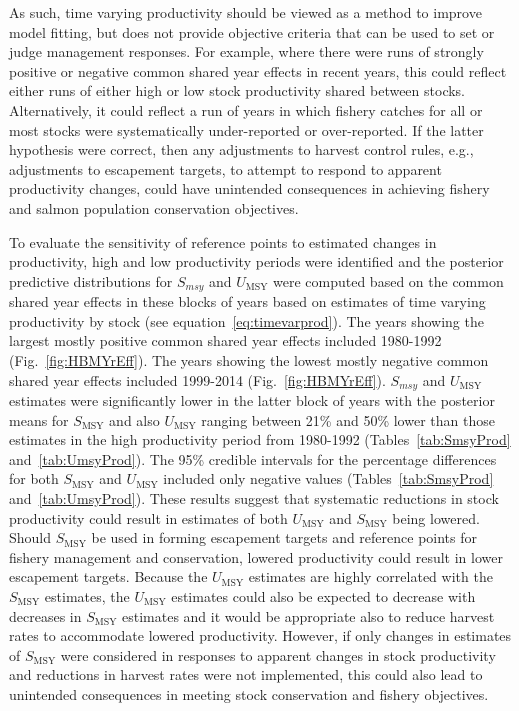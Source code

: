 \documentclass[french,11pt]{book}
\begin{document}
As such, time varying productivity should be viewed as a method to improve model fitting, but does not provide objective criteria that can be used to set or judge management responses. For example, where there were runs of strongly positive or negative common shared year effects in recent years, this could reflect either runs of either high or low stock productivity shared between stocks. Alternatively, it could reflect a run of years in which fishery catches for all or most stocks were systematically under-reported or over-reported. If the latter hypothesis were correct, then any adjustments to harvest control rules, e.g., adjustments to escapement targets, to attempt to respond to apparent productivity changes, could have unintended consequences in achieving fishery and salmon population conservation objectives.

To evaluate the sensitivity of reference points to estimated changes in productivity, high and low productivity periods were identified and the posterior predictive distributions for \(S_{msy}\) and $U_\textrm{MSY}$ were computed based on the common shared year effects in these blocks of years based on estimates of time varying productivity by stock (see equation~\ref{eq:timevarprod}). The years showing the largest mostly positive common shared year effects included 1980-1992 (Fig.~\ref{fig:HBMYrEff}). The years showing the lowest mostly negative common shared year effects included 1999-2014 (Fig.~\ref{fig:HBMYrEff}). \(S_{msy}\) and $U_\textrm{MSY}$ estimates were significantly lower in the latter block of years with the posterior means for $S_\textrm{MSY}$ and also $U_\textrm{MSY}$ ranging between 21\% and 50\% lower than those estimates in the high productivity period from 1980-1992 (Tables~\ref{tab:SmsyProd} and~\ref{tab:UmsyProd}). The 95\% credible intervals for the percentage differences for both $S_\textrm{MSY}$ and $U_\textrm{MSY}$ included only negative values (Tables~\ref{tab:SmsyProd} and~\ref{tab:UmsyProd}). These results suggest that systematic reductions in stock productivity could result in estimates of both $U_\textrm{MSY}$ and $S_\textrm{MSY}$ being lowered. Should $S_\textrm{MSY}$ be used in forming escapement targets and reference points for fishery management and conservation, lowered productivity could result in lower escapement targets. Because the $U_\textrm{MSY}$ estimates are highly correlated with the $S_\textrm{MSY}$ estimates, the $U_\textrm{MSY}$ estimates could also be expected to decrease with decreases in $S_\textrm{MSY}$ estimates and it would be appropriate also to reduce harvest rates to accommodate lowered productivity. However, if only changes in estimates of $S_\textrm{MSY}$ were considered in responses to apparent changes in stock productivity and reductions in harvest rates were not implemented, this could also lead to unintended consequences in meeting stock conservation and fishery objectives.
\end{document}
